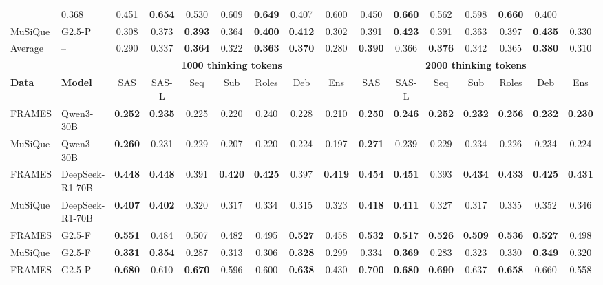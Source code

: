 \documentclass{article} %
\begin{document}
\begin{table}[t]
{\begin{tabular}{ll|ccccccc|ccccccc}
& 0.368 & 0.451 & \textbf{0.654} & 0.530 & 0.609 & \textbf{0.649} & 0.407
& 0.600 & 0.450 & \textbf{0.660} & 0.562 & 0.598 & \textbf{0.660} & 0.400 \\
MuSiQue & G2.5-P
& 0.308 & 0.373 & \textbf{0.393} & 0.364 & \textbf{0.400} & \textbf{0.412} & 0.302
& 0.391 & \textbf{0.423} & 0.391 & 0.363 & 0.397 & \textbf{0.435} & 0.330 \\
\midrule
Average & --
& 0.290 & 0.337 & \textbf{0.364} & 0.322 & \textbf{0.363} & \textbf{0.370} & 0.280
& \textbf{0.390} & 0.366 & \textbf{0.376} & 0.342 & 0.365 & \textbf{0.380} & 0.310 \\
\midrule
& & \multicolumn{7}{c|}{\textbf{1000 thinking tokens}} & \multicolumn{7}{c}{\textbf{2000 thinking tokens}} \\
\cmidrule(lr){3-9}\cmidrule(lr){10-16}
\textbf{Data} & \textbf{Model} &
SAS & SAS-L & Seq & Sub & Roles & Deb & Ens &
SAS & SAS-L & Seq & Sub & Roles & Deb & Ens \\
\midrule
FRAMES & Qwen3-30B
& \textbf{0.252} & \textbf{0.235} & 0.225 & 0.220 & 0.240 & 0.228 & 0.210
& \textbf{0.250} & \textbf{0.246} & \textbf{0.252} & \textbf{0.232} & \textbf{0.256} & \textbf{0.232} & \textbf{0.230} \\
MuSiQue & Qwen3-30B
& \textbf{0.260} & 0.231 & 0.229 & 0.207 & 0.220 & 0.224 & 0.197
& \textbf{0.271} & 0.239 & 0.229 & 0.234 & 0.226 & 0.234 & 0.224 \\
\midrule
FRAMES & DeepSeek-R1-70B
& \textbf{0.448} & \textbf{0.448} & 0.391 & \textbf{0.420} & \textbf{0.425} & 0.397 & \textbf{0.419}
& \textbf{0.454} & \textbf{0.451} & 0.393 & \textbf{0.434} & \textbf{0.433} & \textbf{0.425} & \textbf{0.431} \\
MuSiQue & DeepSeek-R1-70B
& \textbf{0.407} & \textbf{0.402} & 0.320 & 0.317 & 0.334 & 0.315 & 0.323
& \textbf{0.418} & \textbf{0.411} & 0.327 & 0.317 & 0.335 & 0.352 & 0.346 \\
\midrule
FRAMES & G2.5-F
& \textbf{0.551} & 0.484 & 0.507 & 0.482 & 0.495 & \textbf{0.527} & 0.458
& \textbf{0.532} & \textbf{0.517} & \textbf{0.526} & \textbf{0.509} & \textbf{0.536} & \textbf{0.527} & 0.498 \\
MuSiQue & G2.5-F
& \textbf{0.331} & \textbf{0.354} & 0.287 & 0.313 & 0.306 & \textbf{0.328} & 0.299
& 0.334 & \textbf{0.369} & 0.283 & 0.323 & 0.330 & \textbf{0.349} & 0.320 \\
\midrule
FRAMES & G2.5-P
& \textbf{0.680} & 0.610 & \textbf{0.670} & 0.596 & 0.600 & \textbf{0.638} & 0.430
& \textbf{0.700} & \textbf{0.680} & \textbf{0.690} & 0.637 & \textbf{0.658} & 0.660 & 0.558 \\

\end{tabular}}
\end{table}
\end{document}
